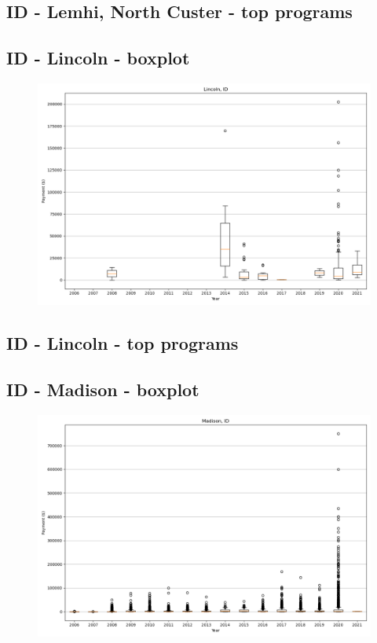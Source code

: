 \subsection*{ID - Lemhi, North Custer - top programs}

\newpage
\subsection*{ID - Lincoln - boxplot}
\begin{figure}[h]
\centering
\includegraphics[width=7in]{../output/boxplots/counties/Lincoln-ID_boxplot.png}
\end{figure}


\subsection*{ID - Lincoln - top programs}

\newpage
\subsection*{ID - Madison - boxplot}
\begin{figure}[h]
\centering
\includegraphics[width=7in]{../output/boxplots/counties/Madison-ID_boxplot.png}
\end{figure}


